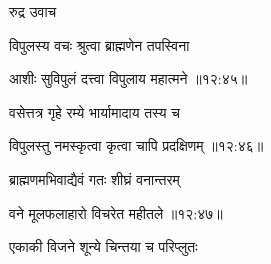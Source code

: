 {\devanagarifont रुद्र उवाच {\dandab}\dontdisplaylinenum  }%

{\devanagarifont विपुलस्य वचः श्रुत्वा ब्राह्मणेन तपस्विना \thinspace{\danda} \dontdisplaylinenum }%


{\devanagarifont आशीः सुविपुलं दत्त्वा विपुलाय महात्मने {॥१२:४५॥} \veg\dontdisplaylinenum }%
 
{\devanagarifont वसेत्तत्र गृहे रम्ये भार्यामादाय तस्य च \thinspace{\dandab} \dontdisplaylinenum }%


{\devanagarifont विपुलस्तु नमस्कृत्वा कृत्वा चापि प्रदक्षिणम् {॥१२:४६॥} \veg\dontdisplaylinenum }%

{\devanagarifont ब्राह्मणमभिवाद्यैवं गतः शीघ्रं वनान्तरम् \thinspace{\dandab} \dontdisplaylinenum }%


{\devanagarifont वने मूलफलाहारो विचरेत महीतले {॥१२:४७॥} \veg\dontdisplaylinenum }%

{\devanagarifont एकाकी विजने शून्ये चिन्तया च परिप्लुतः \thinspace{\dandab} \dontdisplaylinenum }%


